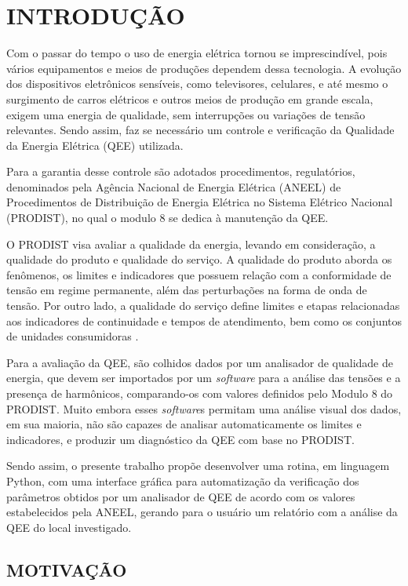 \chapter{INTRODUÇÃO}

Com o passar do tempo o uso de energia elétrica tornou se imprescindível, pois vários equipamentos e meios de produções dependem dessa tecnologia. A evolução dos dispositivos eletrônicos sensíveis, como televisores, celulares, e até mesmo o surgimento de carros elétricos e outros meios de produção em grande escala, exigem uma energia de qualidade, sem interrupções ou variações de tensão relevantes. Sendo assim, faz se necessário um controle e verificação da Qualidade da Energia Elétrica (QEE) utilizada.

Para a garantia desse controle são adotados procedimentos, regulatórios, denominados pela Agência Nacional de Energia Elétrica (ANEEL) de Procedimentos de Distribuição de Energia Elétrica no Sistema Elétrico Nacional (PRODIST), no qual o modulo 8 se dedica à manutenção da QEE.

O PRODIST visa avaliar a qualidade da energia, levando em consideração, a qualidade do produto e qualidade do serviço. A qualidade do produto aborda os fenômenos, os limites e indicadores que possuem relação com a conformidade de tensão em regime permanente, além das perturbações na forma de onda de tensão. Por outro lado, a qualidade do serviço define limites e etapas relacionadas aos indicadores de continuidade e tempos de atendimento, bem como os conjuntos de unidades consumidoras \cite{ref:ANEEL2021}.

Para a avaliação da QEE, são colhidos dados por um analisador de qualidade de energia, que devem ser importados por um \textit{software} para a análise das tensões e a presença de harmônicos, comparando-os com valores definidos pelo Modulo 8 do PRODIST. Muito embora esses \textit{software}s permitam uma análise visual dos dados, em sua maioria, não são capazes de analisar automaticamente os limites e indicadores, e produzir um diagnóstico da QEE com base no PRODIST.

Sendo assim, o presente trabalho propõe desenvolver uma rotina, em linguagem Python, com uma interface gráfica para automatização da verificação dos parâmetros obtidos por um analisador de QEE de acordo com os valores estabelecidos pela ANEEL, gerando para o usuário um relatório com a análise da QEE do local investigado.

\section{MOTIVAÇÃO}

